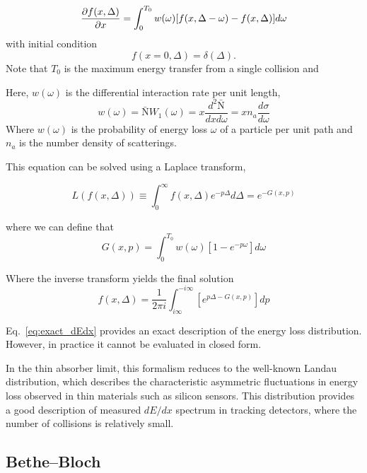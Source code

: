 	\begin{equation}
		\frac{\partial {f(x, \Delta)} } {\partial {x}} = \int_0^{T_0} w(\omega) [f(x, \Delta - \omega) - f(x, \Delta)] d \omega
	\end{equation}
with initial condition
\[
f(x=0,\Delta) = \delta(\Delta).
\]
Note that ${T_0}$ is the maximum energy transfer from a single collision and 


Here, $w(\omega)$ is the differential interaction rate per unit length,
\begin{equation}
w(\omega) = \bar{\text{N}} W_1(\omega) = x \frac{d^2 \bar{\text{N}}}{dx d \omega} = x n_a \frac{d \sigma}{d \omega}
\end{equation}
Where $w(\omega)$ is the probability of energy loss $\omega$ of a particle per unit path and $n_a$ is the number density of scatterings.


	
	
	
	
This equation can be solved using a Laplace transform,
	
	\begin{equation}
		L(f(x, \Delta)) \equiv \int_{0}^{\infty} f(x, \Delta) e^{-p\Delta} d \Delta = e^{-G(x, p)}
	\end{equation}

	where we can define that
	\begin{equation}
		G(x, p) = \int_{0}^{T_0} w(\omega)\left[ 1 - e^{-p\omega} \right] d\omega
	\end{equation}

	
	Where the inverse transform yields the final solution
\begin{equation}
	f(x, \Delta) = \frac{1}{2 \pi i} \int_{i \infty}^{-i \infty} \left[ e^{p \Delta - G(x, p)} \right] dp
	\label{eq:exact_dEdx}
\end{equation}


Eq.~\ref{eq:exact_dEdx} provides an exact description of the energy loss distribution. However, in practice it cannot be evaluated in closed form.

In the thin absorber limit, this formalism reduces to the well-known Landau distribution, which describes the characteristic asymmetric fluctuations in energy loss observed in thin materials such as silicon sensors. This distribution provides a good description of measured $dE/dx$ spectrum in tracking detectors, where the number of collisions is relatively small.

\subsection{Bethe–Bloch}

